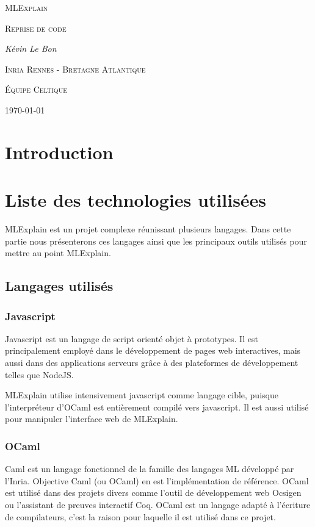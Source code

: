 \documentclass[a4paper,10pt]{report}
\begin{document}
\begin{titlepage}
  \centering
  {\scshape\LARGE MLExplain\par}
  {\scshape\Large Reprise de code\par}
  \vspace{1cm}
  {\Large\itshape Kévin Le Bon\par}
  \vfill
  {\scshape\Large Inria Rennes - Bretagne Atlantique\par}
  {\scshape\large Équipe Celtique\par}
  \vspace{3cm}
  \today\par
\end{titlepage}

\tableofcontents

\begin{abstract}
\end{abstract}

\chapter*{Introduction}
\chapter{Liste des technologies utilisées}
MLExplain est un projet complexe réunissant plusieurs langages. Dans cette 
partie nous présenterons ces langages ainsi que les principaux outils utilisés 
pour mettre au point MLExplain.

\section{Langages utilisés}
\subsection{Javascript}
Javascript est un langage de script orienté objet à prototypes. Il est 
principalement employé dans le développement de pages web interactives, mais 
aussi dans des applications serveurs grâce à des plateformes de développement 
telles que NodeJS.

MLExplain utilise intensivement javascript comme langage cible, puisque 
l'interpréteur d'OCaml est entièrement compilé vers javascript. Il est aussi 
utilisé pour manipuler l'interface web de MLExplain.

\subsection{OCaml}
Caml est un langage fonctionnel de la famille des langages ML développé par 
l'Inria. Objective Caml (ou OCaml) en est l'implémentation de référence. OCaml 
est utilisé dans des projets divers comme l'outil de développement web Ocsigen 
ou l'assistant de preuves interactif Coq. OCaml est un langage adapté à 
l'écriture de compilateurs, c'est la raison pour laquelle il est utilisé dans ce 
projet.
\end{document}
